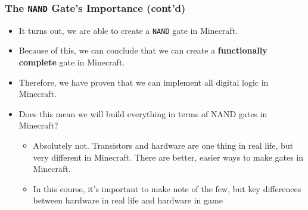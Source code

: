 \documentclass{beamer}
\begin{document}
            \begin{frame}
                \frametitle{The \texttt{NAND} Gate's Importance (cont'd)}
                \begin{itemize}
                    \item It turns out, we are able to create a \texttt{NAND} gate in Minecraft.
                    \item Because of this, we can conclude that we can create a \textbf{functionally complete} gate in Minecraft.
                    \item Therefore, we have proven that we can implement all digital logic in Minecraft.
                    \item Does this mean we will build everything in terms of NAND gates in Minecraft?
                    \begin{itemize}
                        \item Absolutely not. Transistors and hardware are one thing in real life, but very different in Minecraft. There are better, easier ways to make gates in Minecraft.
                        \item In this course, it's important to make note of the few, but key differences between hardware in real life and hardware in game
                    \end{itemize}
                \end{itemize}
               
            \end{frame}
            
\end{document}
